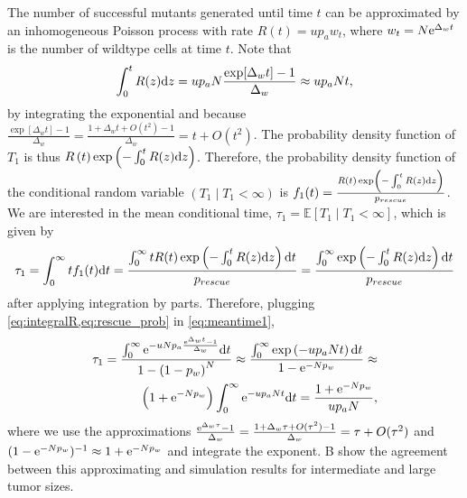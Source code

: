 \documentclass[12pt]{extarticle}
\renewcommand{\d}[1]{\ensuremath{\operatorname{d}\!{#1}}}
\renewcommand{\d}{{\rm d}}
\newcommand{\e}{{\rm e}}
\begin{document}
\begin{appendices}
The number of successful mutants generated until time $t$ can be approximated by an inhomogeneous Poisson process with rate $R\left(t\right) = u p_a w_t$,
where $w_t=N\e^{\Delta_w t}$ is the number of wildtype cells at time $t$.
Note that 
\begin{equation}\label{eq:integralR}
\int_0^{t}{R(z)\d z} = 
u p_a N \frac{\exp[{\Delta_w t}]-1}{\Delta_w} \approx 
u p_a N t,
\end{equation}
by integrating the exponential and because $\frac{\exp[\Delta_w t]-1}{\Delta_w}=\frac{1+\Delta_w t+O(t^2)-1}{\Delta_w}=t+O(t^2)$.
The probability density function of $T_1$ is thus
$R\left(t\right)\exp\left(-\int_0^{t}{R(z)\d z}\right)$. %
Therefore, the probability density function of the conditional random variable $(T_1 \mid T_1 < \infty)$ is
$f_1(t) = \frac{R\left(t\right)\exp\left(-\int_0^{t}{R(z)\d z}\right)}{p_{rescue}}$. 
\\

We are interested in the mean conditional time, $\tau_1=\mathbb{E}\left[T_1 \mid T_1<\infty\right]$, which is given by
\begin{equation}\label{eq:meantime1}
\begin{aligned}
\tau_1 =
\int_{0}^{\infty}{t f_1(t) \d t} = 
\frac{\int_{0}^{\infty}{tR(t)\exp\left(-\int_0^{t}{R(z)\d z}\right) \d t}}{p_{rescue}} = 
\frac{\int_{0}^{\infty}{\exp\left(-\int_0^{t}{R(z)\d z}\right) \d t}}{p_{rescue}}
\end{aligned}
\end{equation}
after applying integration by parts.
Therefore, plugging \cref{eq:integralR,eq:rescue_prob} in \cref{eq:meantime1}, 
\begin{align}\label{eq:limitapprox_appendix}
\tau_1 = 
\frac{\int_0^\infty\e^{-uNp_a\frac{\e^{\Delta_w t}-1}{\Delta_w}} \d t}{1-\left(1-p_w\right)^N} \approx
\frac{\int_{0}^{\infty}{\exp\left(-u p_a N t\right) \d t}}{1-\e^{-Np_w}} \approx \\
\left(1+\e^{-Np_w}\right)\int_0^\infty\e^{-u p_a N t} \d t =
\frac{1+\e^{-Np_w}}{u p_a N} ,
\end{align}
where we use the approximations 
$\frac{\e^{\Delta_w\tau}-1}{\Delta_w}=\frac{1+\Delta_w\tau+O(\tau^2)-1}{\Delta_w}=\tau+O(\tau^2)$ and $(1-\e^{-Np_w})^{-1} \approx 1+\e^{-Np_w}$ and integrate the exponent.
B show the agreement between this approximating and simulation results for intermediate and large tumor sizes.
\\


\end{appendices}
\end{document}
